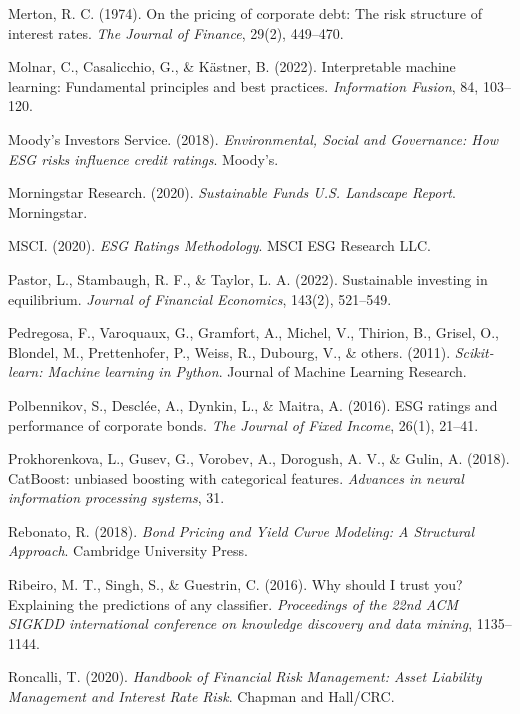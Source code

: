 \begin{thebibliography}{100}
Merton, R. C. (1974). On the pricing of corporate debt: The risk structure of interest rates. \textit{The Journal of Finance}, 29(2), 449--470.

Molnar, C., Casalicchio, G., \& Kästner, B. (2022). Interpretable machine learning: Fundamental principles and best practices. \textit{Information Fusion}, 84, 103--120.

Moody's Investors Service. (2018). \textit{Environmental, Social and Governance: How ESG risks influence credit ratings}. Moody's.

Morningstar Research. (2020). \textit{Sustainable Funds U.S. Landscape Report}. Morningstar.

MSCI. (2020). \textit{ESG Ratings Methodology}. MSCI ESG Research LLC.

Pastor, L., Stambaugh, R. F., \& Taylor, L. A. (2022). Sustainable investing in equilibrium. \textit{Journal of Financial Economics}, 143(2), 521--549.

Pedregosa, F., Varoquaux, G., Gramfort, A., Michel, V., Thirion, B., Grisel, O., Blondel, M., Prettenhofer, P., Weiss, R., Dubourg, V., \& others. (2011). \textit{Scikit-learn: Machine learning in Python}. Journal of Machine Learning Research.

Polbennikov, S., Desclée, A., Dynkin, L., \& Maitra, A. (2016). ESG ratings and performance of corporate bonds. \textit{The Journal of Fixed Income}, 26(1), 21--41.

Prokhorenkova, L., Gusev, G., Vorobev, A., Dorogush, A. V., \& Gulin, A. (2018). CatBoost: unbiased boosting with categorical features. \textit{Advances in neural information processing systems}, 31.

Rebonato, R. (2018). \textit{Bond Pricing and Yield Curve Modeling: A Structural Approach}. Cambridge University Press.

Ribeiro, M. T., Singh, S., \& Guestrin, C. (2016). Why should I trust you? Explaining the predictions of any classifier. \textit{Proceedings of the 22nd ACM SIGKDD international conference on knowledge discovery and data mining}, 1135--1144.

Roncalli, T. (2020). \textit{Handbook of Financial Risk Management: Asset Liability Management and Interest Rate Risk}. Chapman and Hall/CRC.


\end{thebibliography}
